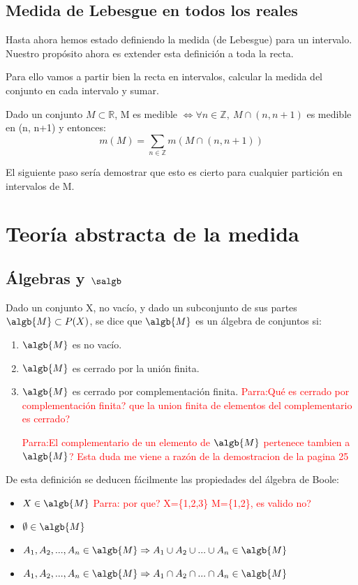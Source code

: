 \documentclass{apuntes}
\begin{document}
\section{Medida de Lebesgue en todos los reales}
Hasta ahora hemos estado definiendo la medida (de Lebesgue) para un intervalo. Nuestro propósito ahora es extender esta definición a toda la recta.

Para ello vamos a partir bien la recta en intervalos, calcular la medida del conjunto en cada intervalo y sumar.

Dado un conjunto $M \subset \mathbb{R}$, M es medible $\Leftrightarrow \forall n \in \mathbb{Z}, \ M \cap(n, n+1)$ es medible en (n, n+1) y entonces:
\[m(M)= \sum_{n \in \mathbb{Z}}m(M \cap (n, n+1))\]

El siguiente paso sería demostrar que esto es cierto para cualquier partición en intervalos de M.


\chapter{Teoría abstracta de la medida}
\section{Álgebras y $\salgb$}
\begin{defn}
Dado un conjunto X, no vacío, y dado un subconjunto de sus partes $\algb{M} \subset P(X)$, se dice que $\algb{M}$ es un álgebra de conjuntos si:
\begin{enumerate}
\item $\algb{M}$ es no vacío.
\item $\algb{M}$ es cerrado por la unión finita.
\item $\algb{M}$ es cerrado por complementación finita. \textcolor{red}{Parra:Qué es cerrado por complementación finita? que la union finita de elementos del complementario es cerrado?}

\textcolor{red}{Parra:El complementario de un elemento de $\algb{M}$ pertenece tambien a $\algb{M}$? Esta duda me viene a razón de la demostracion de la pagina 25}
\end{enumerate}
\end{defn}

De esta definición se deducen fácilmente las propiedades del álgebra de Boole:
\begin{itemize}
\item $X \in \algb{M}$ \textcolor{red}{Parra: por que? X=\{1,2,3\} M=\{1,2\}, es valido no?}
\item $\emptyset \in \algb{M}$
\item $A_1, A_2,...,A_n \in \algb{M} \Rightarrow A_1 \cup A_2 \cup ... \cup A_n \in \algb{M}$
\item $A_1, A_2,...,A_n \in \algb{M} \Rightarrow A_1 \cap A_2 \cap ... \cap A_n \in \algb{M}$
\end{itemize}
\end{document}
